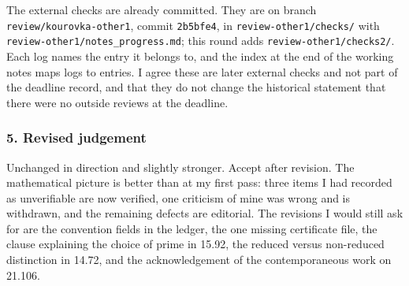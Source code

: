 The external checks are already committed. They are on branch
\nolinkurl{review/kourovka-other1}, commit \nolinkurl{2b5bfe4}, in
\nolinkurl{review-other1/checks/} with
\nolinkurl{review-other1/notes_progress.md}; this round adds
\nolinkurl{review-other1/checks2/}. Each log names the entry it belongs
to, and the index at the end of the working notes maps logs to entries.
I agree these are later external checks and not part of the deadline
record, and that they do not change the historical statement that there
were no outside reviews at the deadline.

\hypertarget{review2-md-revised-judgement}{%
\subsubsection*{5. Revised
judgement}\label{review2-md-revised-judgement}}

Unchanged in direction and slightly stronger. Accept after revision. The
mathematical picture is better than at my first pass: three items I had
recorded as unverifiable are now verified, one criticism of mine was
wrong and is withdrawn, and the remaining defects are editorial. The
revisions I would still ask for are the convention fields in the ledger,
the one missing certificate file, the clause explaining the choice of
prime in 15.92, the reduced versus non-reduced distinction in 14.72, and
the acknowledgement of the contemporaneous work on 21.106.
